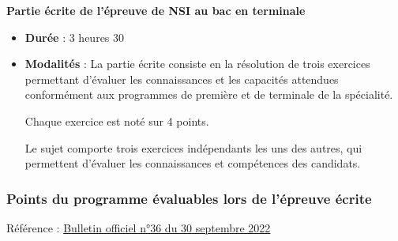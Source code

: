 \documentclass[
  a4paper,
  DIV=11,
  numbers=noendperiod]{scrartcl}
\begin{document}
\textbf{Partie écrite de l'épreuve de NSI au bac en terminale}

\begin{itemize}
\item
  \textbf{Durée} : 3 heures 30
\item
  \textbf{Modalités} : La partie écrite consiste en la résolution de
  trois exercices permettant d'évaluer les connaissances et les
  capacités attendues conformément aux programmes de première et de
  terminale de la spécialité.

  Chaque exercice est noté sur 4 points.

  Le sujet comporte trois exercices indépendants les uns des autres, qui
  permettent d'évaluer les connaissances et compétences des candidats.
\end{itemize}

\hypertarget{points-du-programme-uxe9valuables-lors-de-luxe9preuve-uxe9crite}{%
\subsubsection{Points du programme évaluables lors de l'épreuve
écrite}\label{points-du-programme-uxe9valuables-lors-de-luxe9preuve-uxe9crite}}

Référence :
\href{https://www.education.gouv.fr/bo/22/Hebdo36/MENE2227884N.htm}{Bulletin
officiel n°36 du 30 septembre 2022}
\end{document}
